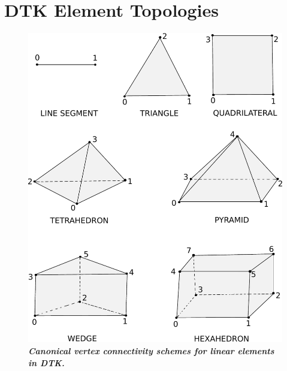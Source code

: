 \documentclass[letterpaper,12pt]{article}
\begin{document}
\clearpage




\clearpage

\appendix
\section{DTK Element Topologies}\label{apdx:cell_topo}

\begin{figure}[htpb!]
  \centering
  \includegraphics[width=5.5in]{Linear_Elements.pdf}
  \caption{\bf \sl Canonical vertex connectivity schemes for linear
    elements in DTK.}
  \label{fig:linear_elements}
\end{figure}

\clearpage

\end{document}
